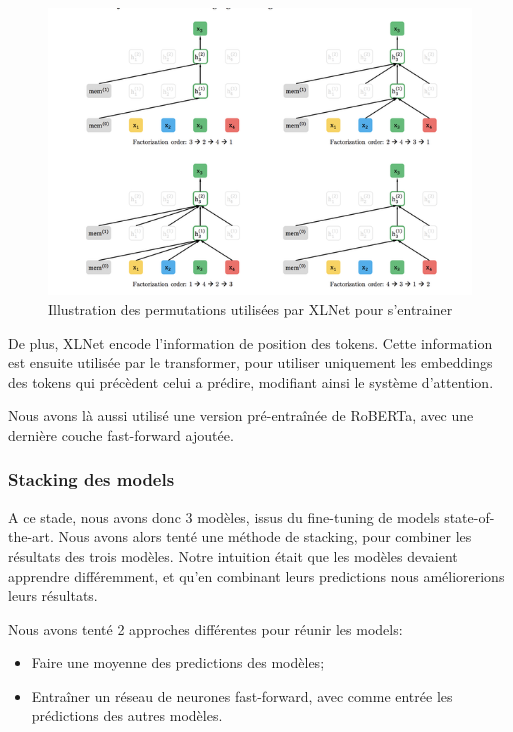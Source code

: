 \documentclass[11pt,a4paper, french]{article}
\begin{document}
\begin{figure}
  \includegraphics[width=\linewidth]{resources/xlnet-permutations.png}
  \caption{Illustration des permutations utilisées par XLNet pour s'entrainer}
  \label{fig:XLNet:permutations}
\end{figure}


De plus, XLNet encode l'information de position des tokens. Cette information est ensuite utilisée par le transformer, pour utiliser uniquement les embeddings des tokens qui précèdent celui a prédire, modifiant ainsi le système d'attention.

Nous avons là aussi utilisé une version pré-entraînée de RoBERTa, avec une dernière couche fast-forward ajoutée.

\subsubsection{Stacking des models}

A ce stade, nous avons donc 3 modèles, issus du fine-tuning de models state-of-the-art. Nous avons alors tenté une méthode de stacking, pour combiner les résultats des trois modèles. Notre intuition était que les modèles devaient apprendre différemment, et qu'en combinant leurs predictions nous améliorerions leurs résultats.

Nous avons tenté 2 approches différentes pour réunir les models:

\begin{itemize}
  \item Faire une moyenne des predictions des modèles;
  \item Entraîner un réseau de neurones fast-forward, avec comme entrée les prédictions des autres modèles.
\end{itemize}
\end{document}
